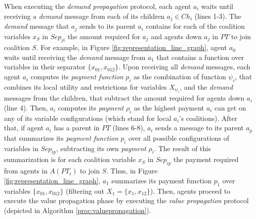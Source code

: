 \documentclass{aamas2012}
\begin{document}

When executing the \emph{demand propagation} protocol, each agent $a_i$ waits
until receiving a \emph{demand} message from each of its children $a_j \in Ch_i$
(lines 1-3). The \emph{demand} message that $a_j$ sends to its parent $a_i$
contains for each of the coalition variables $x_S$ in $Sep_{ji}$ the amount
required for $a_j$ and agents down $a_j$ in $PT$ to join coalition $S$. For
example, in Figure \ref{fig:representation_line_graph}, agent $a_0$ waits until
receiving the \emph{demand} message from $a_1$ that contains a function over
variables in their separator $\{x_{01},x_{012}\}$. Upon receiving all
\emph{demand} messages, each agent $a_i$ computes its \emph{payment function}
$p_i$ as the combination of function $\psi_i$, that combines its local utility
and restrictions for variables $X_{\psi_i}$, and the \emph{demand} messages from
the children, that subtract the amount required for agents down $a_i$ (line 4).
Then, $a_i$ computes its \emph{payment} $\rho_i$ as the highest payment $a_i$
can get on any of its variable configurations (which stand for local $a_i$'s
coalitions). After that, if agent $a_i$ has a parent in $PT$ (lines 6-8), $a_i$
sends a message to its parent $a_p$ that summarizes its \emph{payment function}
$p_i$ over all possible configurations of variables in $Sep_{ip}$, subtracting its own
\emph{payment} $\rho_i$. The result of this summarization is for each coalition
variable $x_S$ in $Sep_{ip}$ the payment required from agents in $A(PT_i)$ to
join $S$. Thus, in Figure \ref{fig:representation_line_graph}, $a_1$ summarizes
its payment function $p_1$ over variables $\{x_{01},x_{012}\}$ (filtering out
$X_1=\{x_1,x_{12}\}$). Then, agents proceed to execute the value propagation
phase by executing the \emph{value propagation} protocol (depicted in
Algorithm \ref{proc:valuepropagation}).
\end{document}
